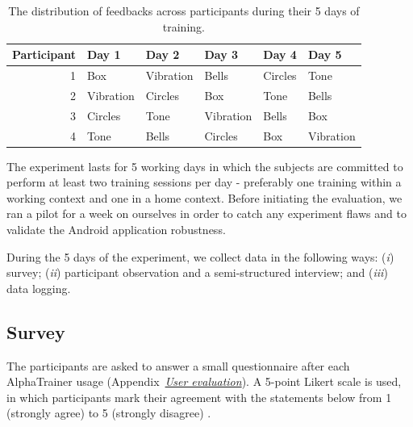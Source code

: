 \documentclass[a4paper,10pt,english,lof,lot,twoside]{puthesis}
\begin{document}
\begin{table}
\capstart
\begin{center}

\begin{tabular}{r l l l l l}

\toprule
\textsf{\relax 
Participant
} & \textsf{\relax 
Day 1
} & \textsf{\relax 
Day 2
} & \textsf{\relax 
Day 3
} & \textsf{\relax 
Day 4
} & \textsf{\relax 
Day 5
}\\
\hline\midrule

1
 & 
Box
 & 
Vibration
 & 
Bells
 & 
Circles
 & 
Tone
\\

2
 & 
Vibration
 & 
Circles
 & 
Box
 & 
Tone
 & 
Bells
\\

3
 & 
Circles
 & 
Tone
 & 
Vibration
 & 
Bells
 & 
Box
\\

4
 & 
Tone
 & 
Bells
 & 
Circles
 & 
Box
 & 
Vibration
\\
\hline\bottomrule

\end{tabular}
\caption[The distribution of feedbacks across participants during their 5 days of training]{The distribution of feedbacks across participants during their 5 days of training.}\label{ch-evaluation/index:table-latin-square-feedbacks}
\end{center}
\end{table}

The experiment lasts for 5 working days in which the subjects are committed to perform at least two training sessions per day - preferably one training within a working context and one in a home context. Before initiating the evaluation, we ran a pilot for a week on ourselves in order to catch any experiment flaws and to validate the Android application robustness.

During the 5 days of the experiment, we collect data in the following ways: (\emph{i}) survey;
(\emph{ii}) participant observation and a semi-structured interview; and (\emph{iii}) data logging.


\subsection{Survey}
\label{ch-evaluation/index:survey}
The participants are asked to answer a small questionnaire after each AlphaTrainer usage (Appendix {\hyperref[appendix_evaluation:appendix-final-evaluation]{\emph{User evaluation}}}). A 5-point Likert scale is used, in which participants mark their agreement with the statements below from 1 (strongly agree) to 5 (strongly disagree) \cite{lazar_research_2010}.
\end{document}
